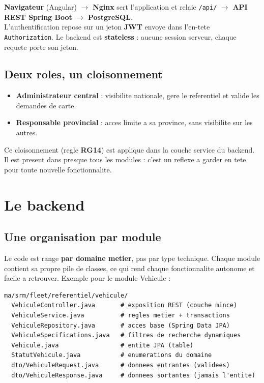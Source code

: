 \documentclass[11pt]{article}
\begin{document}
\begin{srmnote}
\textbf{Navigateur} (Angular) \;$\rightarrow$\; \textbf{Nginx} sert l'application et relaie \texttt{/api/}
\;$\rightarrow$\; \textbf{API REST Spring Boot} \;$\rightarrow$\; \textbf{PostgreSQL}.\\
L'authentification repose sur un jeton \textbf{JWT} envoye dans l'en-tete \texttt{Authorization}. Le
backend est \textbf{stateless} : aucune session serveur, chaque requete porte son jeton.
\end{srmnote}

\subsection{Deux roles, un cloisonnement}
\begin{itemize}
  \item \textbf{Administrateur central} : visibilite nationale, gere le referentiel et valide les demandes de carte.
  \item \textbf{Responsable provincial} : acces limite a sa province, sans visibilite sur les autres.
\end{itemize}
Ce cloisonnement (regle \textbf{RG14}) est applique dans la couche service du backend. Il est present
dans presque tous les modules : c'est un reflexe a garder en tete pour toute nouvelle fonctionnalite.

\section{Le backend}

\subsection{Une organisation par module}
Le code est range \textbf{par domaine metier}, pas par type technique. Chaque module contient sa propre
pile de classes, ce qui rend chaque fonctionnalite autonome et facile a retrouver. Exemple pour le
module Vehicule :
\begin{lstlisting}
ma/srm/fleet/referentiel/vehicule/
  VehiculeController.java       # exposition REST (couche mince)
  VehiculeService.java          # regles metier + transactions
  VehiculeRepository.java       # acces base (Spring Data JPA)
  VehiculeSpecifications.java   # filtres de recherche dynamiques
  Vehicule.java                 # entite JPA (table)
  StatutVehicule.java           # enumerations du domaine
  dto/VehiculeRequest.java      # donnees entrantes (validees)
  dto/VehiculeResponse.java     # donnees sortantes (jamais l'entite)
\end{lstlisting}
\end{document}

